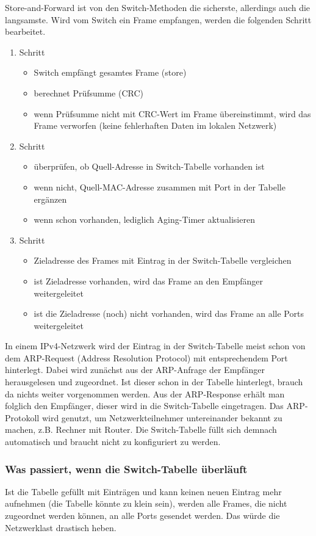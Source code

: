 Store-and-Forward ist von den Switch-Methoden die sicherste, allerdings auch die langsamste.
Wird vom Switch ein Frame empfangen, werden die folgenden Schritt bearbeitet.
\begin{enumerate}
\item Schritt
	\begin{itemize}
	\item Switch empfängt gesamtes Frame (store)
	\item berechnet Prüfsumme (CRC)
	\item wenn Prüfsumme nicht mit CRC-Wert im Frame übereinstimmt, wird das Frame verworfen (keine fehlerhaften Daten im lokalen Netzwerk)
	\end{itemize}
\item Schritt
	\begin{itemize}
	\item überprüfen, ob Quell-Adresse in Switch-Tabelle vorhanden ist
	\item wenn nicht, Quell-MAC-Adresse zusammen mit Port in der Tabelle ergänzen
	\item wenn schon vorhanden, lediglich Aging-Timer aktualisieren
	\end{itemize}
\item Schritt
	\begin{itemize}
	\item Zieladresse des Frames mit Eintrag in der Switch-Tabelle vergleichen
	\item ist Zieladresse vorhanden, wird das Frame an den Empfänger weitergeleitet
	\item ist die Zieladresse (noch) nicht vorhanden, wird das Frame an alle Ports weitergeleitet
	\end{itemize}
\end{enumerate}

In einem IPv4-Netzwerk wird der Eintrag in der Switch-Tabelle meist schon von dem ARP-Request (Address Resolution Protocol) mit entsprechendem Port hinterlegt. Dabei wird zunächst aus der ARP-Anfrage der Empfänger herausgelesen und zugeordnet. Ist dieser schon in der Tabelle hinterlegt, brauch da nichts weiter vorgenommen werden. Aus der ARP-Response erhält man folglich den Empfänger, dieser wird in die Switch-Tabelle eingetragen.
Das ARP-Protokoll wird genutzt, um Netzwerkteilnehmer untereinander bekannt zu machen, z.B. Rechner mit Router.
Die Switch-Tabelle füllt sich demnach automatisch und braucht nicht zu konfiguriert zu werden.

\subsubsection{Was passiert, wenn die Switch-Tabelle überläuft}
Ist die Tabelle gefüllt mit Einträgen und kann keinen neuen Eintrag mehr aufnehmen (die Tabelle könnte zu klein sein), werden alle Frames, die nicht zugeordnet werden können, an alle Ports gesendet werden. Das würde die Netzwerklast drastisch heben.